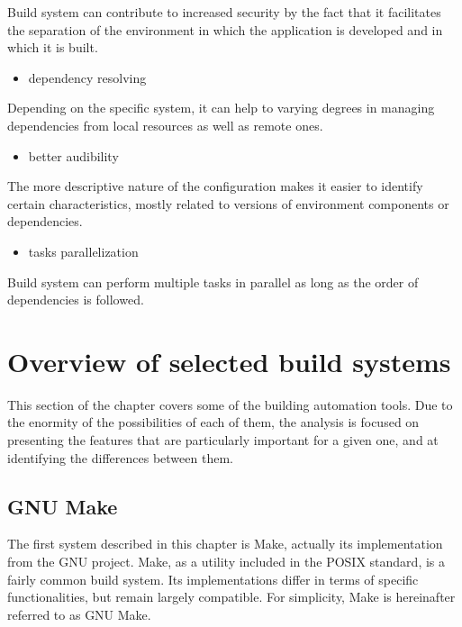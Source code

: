 Build system can contribute to increased security by the fact that it
facilitates the separation of the environment in which the application
is developed and in which it is built.

\begin{itemize}
\item
  dependency resolving
\end{itemize}

Depending on the specific system, it can help to varying degrees in
managing dependencies from local resources as well as remote ones.

\begin{itemize}
\item
  better audibility
\end{itemize}

The more descriptive nature of the configuration makes it easier to
identify certain characteristics, mostly related to versions of
environment components or dependencies.

\begin{itemize}
\item
  tasks parallelization
\end{itemize}

Build system can perform multiple tasks in parallel as long as the order
of dependencies is followed.

\hypertarget{overview-of-selected-build-systems}{%
\section{Overview of selected build
systems}\label{overview-of-selected-build-systems}}

This section of the chapter covers some of the building automation
tools. Due to the enormity of the possibilities of each of them, the
analysis is focused on presenting the features that are particularly
important for a given one, and at identifying the differences between
them.

\hypertarget{gnu-make}{%
\subsection{GNU Make}\label{gnu-make}}

The first system described in this chapter is Make, actually its
implementation from the GNU project. Make, as a utility included in the
POSIX standard\cite{MAKEPOSIX}, is a fairly common build system. Its implementations
differ in terms of specific functionalities, but remain largely
compatible. For simplicity, Make is hereinafter referred to as GNU Make.

